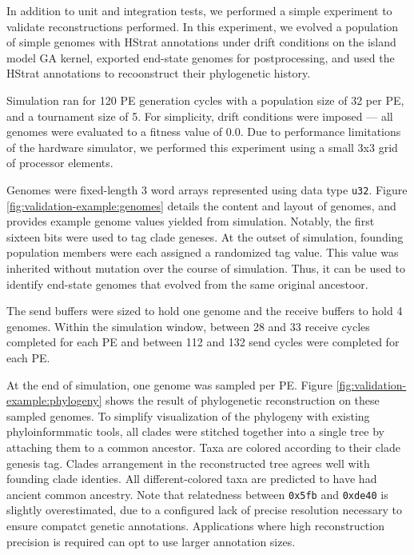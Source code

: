 In addition to unit and integration tests, we performed a simple experiment to validate reconstructions performed.
In this experiment, we evolved a population of simple genomes with HStrat annotations under drift conditions on the island model GA kernel, exported end-state genomes for postprocessing, and used the HStrat annotations to recoonstruct their phylogenetic history.

Simulation ran for 120 PE generation cycles with a population size of 32 per PE, and a tournament size of 5.
For simplicity, drift conditions were imposed --- all genomes were evaluated to a fitness value of 0.0.
Due to performance limitations of the hardware simulator, we performed this experiment using a small 3x3 grid of processor elements.

Genomes were fixed-length 3 word arrays represented using data type \texttt{u32}.
Figure \ref{fig:validation-example:genomes} details the content and layout of genomes, and provides example genome values yielded from simulation.
Notably, the first sixteen bits were used to tag clade geneses.
At the outset of simulation, founding population members were each assigned a randomized tag value.
This value was inherited without mutation over the course of simulation.
Thus, it can be used to identify end-state genomes that evolved from the same original ancestoor.

The send buffers were sized to hold one genome and the receive buffers to hold 4 genomes.
Within the simulation window, between 28 and 33 receive cycles completed for each PE and between 112 and 132 send cycles were completed for each PE.



At the end of simulation, one genome was sampled per PE.
Figure \ref{fig:validation-example:phylogeny} shows the result of phylogenetic reconstruction on these sampled genomes.
To simplify visualization of the phylogeny with existing phyloinformmatic tools, all clades were stitched together into a single tree by attaching them to a common ancestor.
Taxa are colored according to their clade genesis tag.
Clades arrangement in the reconstructed tree agrees well with founding clade identies.
All different-colored taxa are predicted to have had ancient common ancestry.
Note that relatedness between \texttt{0x5fb} and \texttt{0xde40} is slightly overestimated, due to a configured lack of precise resolution necessary to ensure compatct genetic annotations.
Applications where high reconstruction precision is required can opt to use larger annotation sizes.


